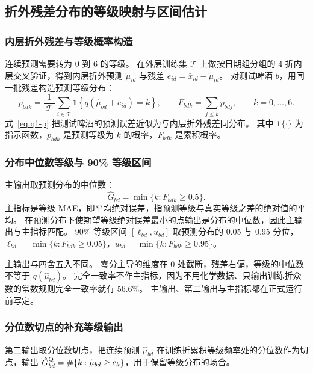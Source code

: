 \subsection{折外残差分布的等级映射与区间估计}

\subsubsection{内层折外残差与等级概率构造}

连续预测需要转为 0 到 6 的等级。
在外层训练集 $\mathcal T$ 上做按日期组分组的 4 折内层交叉验证，得到内层折外预测 $\tilde\mu_{id}$ 与残差 $e_{id}=\bar x_{id}-\tilde\mu_{id}$。
对测试啤酒 $b$，用同一批残差构造预测等级分布：
\begin{equation}\label{eq:q1-p}
p_{bdk}=\frac{1}{|\mathcal T|}\sum_{i\in\mathcal T}\mathbf 1\!\left\{q(\hat\mu_{bd}+e_{id})=k\right\},\qquad F_{bdk}=\sum_{j\le k}p_{bdj},\qquad k=0,\dots,6 .
\end{equation}
式~\eqref{eq:q1-p} 把测试啤酒的预测误差近似为与内层折外残差同分布。
其中 $\mathbf 1\{\cdot\}$ 为指示函数，$p_{bdk}$ 是预测等级为 $k$ 的概率，$F_{bdk}$ 是累积概率。

\subsubsection{分布中位数等级与 90\% 等级区间}

主输出取预测分布的中位数：
\begin{equation}\label{eq:q1-median}
\hat G_{bd}=\min\{k: F_{bdk}\ge 0.5\}.
\end{equation}
主指标是等级 MAE，即平均绝对误差，指预测等级与真实等级之差的绝对值的平均。
在预测分布下使期望等级绝对误差最小的点输出是分布的中位数，因此主输出与主指标匹配。
90\% 等级区间 $[\ell_{bd},u_{bd}]$ 取预测分布的 0.05 与 0.95 分位，$\ell_{bd}=\min\{k:F_{bdk}\ge0.05\}$，$u_{bd}=\min\{k:F_{bdk}\ge0.95\}$。

主输出与四舍五入不同。
零分主导的维度在 0 处截断，残差右偏，等级的中位数不等于 $q(\hat\mu_{bd})$。
完全一致率不作主指标，因为不用化学数据、只输出训练折众数的常数规则完全一致率就有 56.6\%。
主输出、第二输出与主指标都在正式运行前写定。

\subsubsection{分位数切点的补充等级输出}

第二输出取分位数切点，把连续预测 $\hat\mu_{bd}$ 在训练折累积等级频率处的分位数作为切点，输出 $\hat G^{\rm Q}_{bd}=\#\{k:\hat\mu_{bd}\ge c_k\}$，用于保留等级分布的场合。

